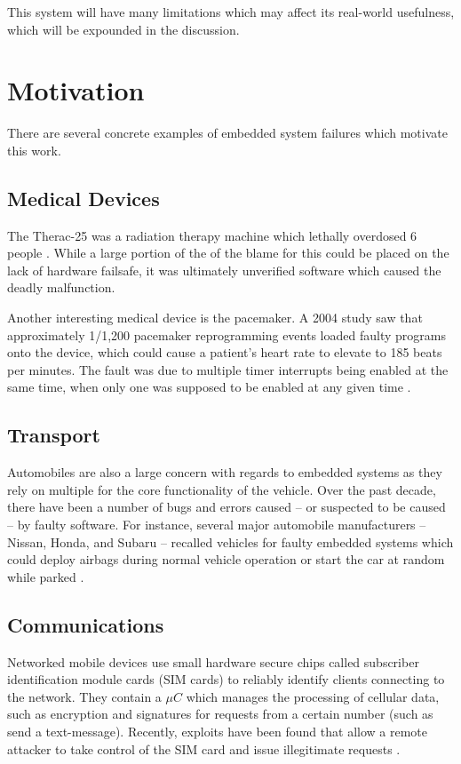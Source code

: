 \documentclass[preprint,12pt]{sigplanconf}
\begin{document}
This system will have many limitations which may affect its real-world usefulness,
which will be expounded in the discussion.

\section{Motivation}
There are several concrete examples of embedded system failures which
motivate this work.
\subsection{Medical Devices}
The Therac-25 was a radiation therapy machine which lethally overdosed
6 people \cite{therac}. While a large portion of the of the blame for
this could be placed on the lack of hardware failsafe, it was
ultimately unverified software which caused the deadly malfunction.

Another interesting medical device is the pacemaker. A 2004 study saw
that approximately 1/1,200 pacemaker reprogramming events loaded faulty
programs onto the device, which could cause a patient's heart rate to
elevate to 185 beats per minutes. The fault was due to multiple
timer interrupts being enabled at the same time, when only one was
supposed to be enabled at any given time \cite{pacemaker}.
\subsection{Transport}
Automobiles are also a large concern with regards to embedded systems
as they rely on multiple for the core functionality of the
vehicle. Over the past decade, there have been a number of
bugs and errors caused -- or suspected to be caused -- by faulty
software.  For instance, several major automobile manufacturers --
Nissan, Honda, and Subaru -- recalled vehicles for faulty embedded
systems which could deploy airbags during normal vehicle operation or
start the car at random while parked \cite{cars}.

\subsection{Communications}
Networked mobile devices use small hardware secure chips called
subscriber identification module cards (SIM cards) to reliably
identify clients connecting to the network. They contain a $\mu C$
which manages the processing of cellular data, such as encryption and
signatures for requests from a certain number (such as send a
text-message). Recently, exploits have been found that allow a remote
attacker to take control of the SIM card and issue illegitimate
requests \cite{sim}.
\end{document}
